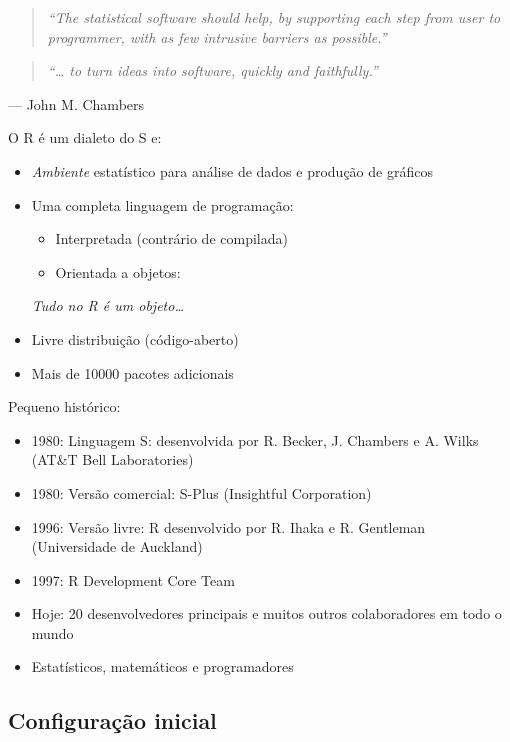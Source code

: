 \documentclass[10pt,a4paper]{book}
\providecommand{\tightlist}{%
  \setlength{\itemsep}{0pt}\setlength{\parskip}{0pt}}
\begin{document}
\begin{quote}
\emph{``The statistical software should help, by supporting each step
from user to programmer, with as few intrusive barriers as possible.''}
\end{quote}

\begin{quote}
\emph{``\ldots{} to turn ideas into software, quickly and faithfully.''}
\end{quote}

--- John M. Chambers

O R é um dialeto do S e:

\begin{itemize}
\item
  \emph{Ambiente} estatístico para análise de dados e produção de
  gráficos
\item
  Uma completa linguagem de programação:

  \begin{itemize}
  \tightlist
  \item
    Interpretada (contrário de compilada)
  \item
    Orientada a objetos:
  \end{itemize}

  \emph{Tudo no R é um objeto\ldots{}}
\item
  Livre distribuição (código-aberto)
\item
  Mais de 10000 pacotes adicionais
\end{itemize}

Pequeno histórico:

\begin{itemize}
\tightlist
\item
  1980: Linguagem S: desenvolvida por R. Becker, J. Chambers e A. Wilks
  (AT\&T Bell Laboratories)
\item
  1980: Versão comercial: S-Plus (Insightful Corporation)
\item
  1996: Versão livre: R desenvolvido por R. Ihaka e R. Gentleman
  (Universidade de Auckland)
\item
  1997: R Development Core Team
\item
  Hoje: 20 desenvolvedores principais e muitos outros colaboradores em
  todo o mundo
\item
  Estatísticos, matemáticos e programadores
\end{itemize}

\subsection{Configuração inicial}\label{configuracao-inicial}
\end{document}
